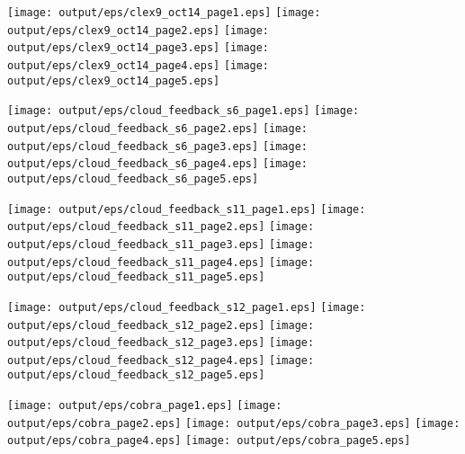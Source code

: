 \documentclass[11pt]{article}
\begin{document}
\begin{center}

\texttt{[image: output/eps/clex9\_oct14\_page1.eps]}
\texttt{[image: output/eps/clex9\_oct14\_page2.eps]}
\texttt{[image: output/eps/clex9\_oct14\_page3.eps]}
\texttt{[image: output/eps/clex9\_oct14\_page4.eps]}
\texttt{[image: output/eps/clex9\_oct14\_page5.eps]}
\end{center}
\newpage

\begin{center}

\texttt{[image: output/eps/cloud\_feedback\_s6\_page1.eps]}
\texttt{[image: output/eps/cloud\_feedback\_s6\_page2.eps]}
\texttt{[image: output/eps/cloud\_feedback\_s6\_page3.eps]}
\texttt{[image: output/eps/cloud\_feedback\_s6\_page4.eps]}
\texttt{[image: output/eps/cloud\_feedback\_s6\_page5.eps]}
\end{center}
\newpage

\begin{center}

\texttt{[image: output/eps/cloud\_feedback\_s11\_page1.eps]}
\texttt{[image: output/eps/cloud\_feedback\_s11\_page2.eps]}
\texttt{[image: output/eps/cloud\_feedback\_s11\_page3.eps]}
\texttt{[image: output/eps/cloud\_feedback\_s11\_page4.eps]}
\texttt{[image: output/eps/cloud\_feedback\_s11\_page5.eps]}
\end{center}
\newpage

\begin{center}

\texttt{[image: output/eps/cloud\_feedback\_s12\_page1.eps]}
\texttt{[image: output/eps/cloud\_feedback\_s12\_page2.eps]}
\texttt{[image: output/eps/cloud\_feedback\_s12\_page3.eps]}
\texttt{[image: output/eps/cloud\_feedback\_s12\_page4.eps]}
\texttt{[image: output/eps/cloud\_feedback\_s12\_page5.eps]}
\end{center}
\newpage

\begin{center}

\texttt{[image: output/eps/cobra\_page1.eps]}
\texttt{[image: output/eps/cobra\_page2.eps]}
\texttt{[image: output/eps/cobra\_page3.eps]}
\texttt{[image: output/eps/cobra\_page4.eps]}
\texttt{[image: output/eps/cobra\_page5.eps]}
\end{center}
\newpage
\end{document}
